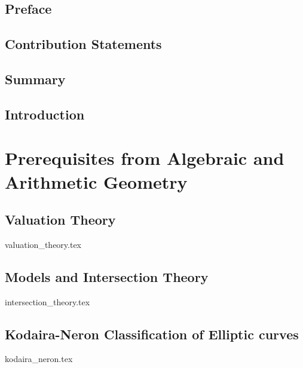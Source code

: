 


\rmfamily
\setcounter{page}{0}
\newpage
\chapter*{Preface} \label{chap:preface}
\chapter*{Contribution Statements} \label{chap:acknowledgements}
\chapter*{Summary} \label{chap:introduction}

\myprintglossary
\myprintnomenclature
\tableofcontents
\listoftodos


\setcounter{page}{0}

\chapter{Introduction} \label{chap:introduction}
%

\part{Prerequisites from Algebraic and Arithmetic Geometry}
\chapter{Valuation Theory} \label{chap:valuation_theory}
{valuation_theory.tex}



\chapter{Models and Intersection Theory} \label{chap:models_and_intersection_theory}
{intersection_theory.tex}

\chapter{Kodaira-Neron Classification of Elliptic curves} \label{chap:kodaira_neron_classification_of_elliptic_curves}
{kodaira_neron.tex}

